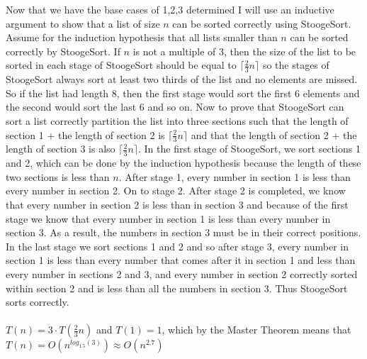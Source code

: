 \documentclass{article}
\begin{document}
\begin{enumerate}
	Now that we have the base cases of 1,2,3 determined I will use an inductive argument to show that a list of size $n$ can be sorted correctly using StoogeSort.  Assume for the induction hypothesis that all lists smaller than $n$ can be sorted correctly by StoogeSort.  If $n$ is not a multiple of 3, then the size of the list to be sorted in each stage of StoogeSort should be equal to $\lceil \frac{2}{3}n \rceil$ so the stages of StoogeSort always sort at least two thirds of the list and no elements are missed.  So if the list had length 8, then the first stage would sort the first 6 elements and the second would sort the last 6 and so on.  Now to prove that StoogeSort can sort a list correctly partition the list into three sections such that the length of section 1 + the length of section 2 is $\lceil \frac{2}{3}n \rceil$ and that the length of section 2 + the length of section 3 is also $\lceil \frac{2}{3}n \rceil$.  In the first stage of StoogeSort, we sort sections 1 and 2, which can be done by the induction hypothesis because the length of these two sections is less than $n$.  After stage 1, every number in section 1 is less than every number in section 2.  On to stage 2.  After stage 2 is completed, we know that every number in section 2 is less than in section 3 and because of the first stage we know that every number in section 1 is less than every number in section 3. As a result, the numbers in section 3 must be in their correct positions.  In the last stage we sort sections 1 and 2 and so after stage 3, every number in section 1 is less than every number that comes after it in section 1 and less than every number in sections 2 and 3, and every number in section 2 correctly sorted within section 2 and is less than all the numbers in section 3.  Thus StoogeSort sorts correctly. \\
	\\
	$T(n) = 3\cdot T(\frac{2}{3}n)$ and $T(1) = 1$, which by the Master Theorem means that $T(n) = O(n^{log_{1.5}(3)}) \approx O(n^{2.7})$
	

\end{enumerate}
\end{document}
